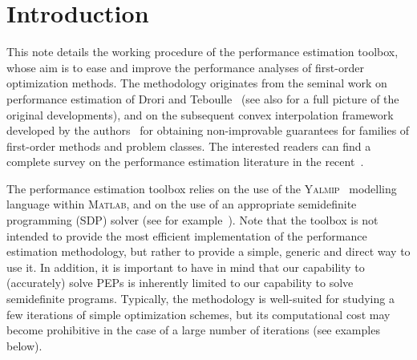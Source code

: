\documentclass[11pt,a4paper]{article}
\begin{document}
	\section{Introduction}			%

	This note details the working procedure of the performance estimation toolbox, whose aim is to ease and improve the performance analyses of first-order optimization methods. The methodology originates from the seminal work on performance estimation of Drori and Teboulle~\cite{Article:Drori} (see also \cite{drori2014contributions} for a full picture of the original developments), and on the subsequent convex interpolation framework developed by the authors~\cite{taylor2015smooth,taylor2015exact} for obtaining non-improvable guarantees for families of first-order methods and problem classes. The interested readers can find a complete survey on the performance estimation literature in the recent~\cite{Taylor2017PEPs}.

	The performance estimation toolbox relies on the use of the \textsc{Yalmip}~\cite{Article:Yalmip} modelling language within \textsc{Matlab}, and on the use of an appropriate semidefinite programming (SDP) solver (see for example~\cite{Article:Sedumi,Article:Mosek,Article:sdpt3}). Note that the toolbox is not intended to provide the most efficient implementation of the performance estimation methodology, but rather to provide a simple, generic and direct way to use it. In addition, it is important to have in mind that our capability to (accurately) solve PEPs is inherently limited to our capability to solve semidefinite programs. Typically, the methodology is well-suited for studying a few iterations of simple optimization schemes, but its computational cost may become prohibitive in the case of a large number of iterations (see examples below).
\end{document}
